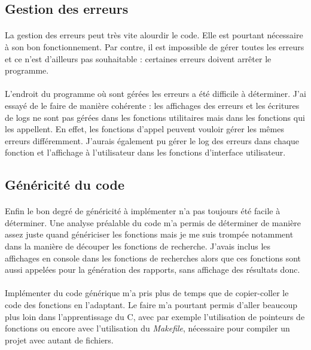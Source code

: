 \documentclass{article}
\begin{document}
    \subsection{Gestion des erreurs}
    \paragraph{}
    La gestion des erreurs peut très vite alourdir le code. Elle est pourtant nécessaire à son bon fonctionnement. Par contre, il est impossible de gérer toutes les erreurs et ce n'est d'ailleurs pas souhaitable : certaines erreurs doivent arrêter le programme.

    \paragraph{}
    L'endroit du programme où sont gérées les erreurs a été difficile à déterminer. J'ai essayé de le faire de manière cohérente : les affichages des erreurs et les écritures de logs ne sont pas gérées dans les fonctions utilitaires mais dans les fonctions qui les appellent. En effet, les fonctions d'appel peuvent vouloir gérer les mêmes erreurs différemment. J'aurais également pu gérer le log des erreurs dans chaque fonction et l'affichage à l'utilisateur dans les fonctions d'interface utilisateur.


    \subsection{Généricité du code}
    \paragraph{}
    Enfin le bon degré de généricité à implémenter n'a pas toujours été facile à déterminer. Une analyse préalable du code m'a permis de déterminer de manière assez juste quand génériciser les fonctions mais je me suis trompée notamment dans la manière de découper les fonctions de recherche. J'avais inclus les affichages en console dans les fonctions de recherches alors que ces fonctions sont aussi appelées pour la génération des rapports, sans affichage des résultats donc.

    \paragraph{}
    Implémenter du code générique m'a pris plus de temps que de copier-coller le code des fonctions en l'adaptant. Le faire m'a pourtant permis d'aller beaucoup plus loin dans l'apprentissage du C, avec par exemple l'utilisation de pointeurs de fonctions ou encore avec l'utilisation du \emph{Makefile}, nécessaire pour compiler un projet avec autant de fichiers.
\end{document}
